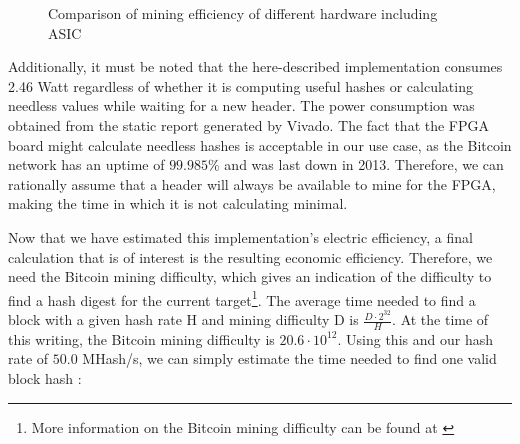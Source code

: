 \begin{figure}
\caption{Comparison of mining efficiency of different hardware including ASIC\label{perf:efficiencyWASIC}}
\end{figure}

Additionally, it must be noted that the here-described implementation consumes 2.46 Watt regardless of whether it is computing useful hashes or calculating needless values while waiting for a new header. The power consumption was obtained from the static report generated by Vivado. The fact that the FPGA board might calculate needless hashes is acceptable in our use case, as the Bitcoin network has an uptime of $99.985\%$ and was last down in 2013. Therefore, we can rationally assume that a header will always be available to mine for the FPGA, making the time in which it is not calculating minimal. 

Now that we have estimated this implementation's electric efficiency, a final calculation that is of interest is the resulting economic efficiency. Therefore, we need the Bitcoin mining difficulty, which gives an indication of the difficulty to find a hash digest for the current target\footnote{More information on the Bitcoin mining difficulty can be found at \cite{bitcoinWikiDifficulty}}. The average time needed to find a block with a given hash rate H and mining difficulty D is $\frac{D \cdot 2^{32}}{H}$. At the time of this writing, the Bitcoin mining difficulty is $20.6 \cdot {10^{12}}$. Using this and our hash rate of $50.0$ MHash/s, we can simply estimate the time needed to find one valid block hash \cite{bitcoinWikiDifficulty}:


